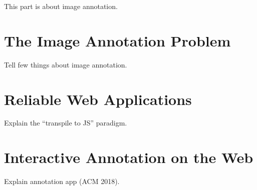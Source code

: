 This part is about image annotation.

\chapter{The Image Annotation Problem}%
\label{cha:the_image_annotation_problem}

Tell few things about image annotation.



\chapter{Reliable Web Applications}%
\label{cha:reliable_web_applications}

Explain the ``transpile to JS'' paradigm.

\chapter{Interactive Annotation on the Web}%
\label{cha:interactive_annotation_on_the_web}

Explain annotation app (ACM 2018).

